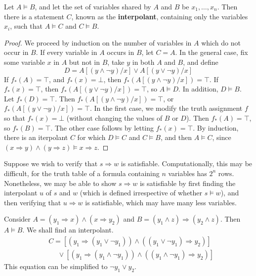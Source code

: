 \begin{theorem}
    Let $A \vDash B$, and let the set of variables shared by $A$ and $B$ be $x_1, \dots, x_n$. Then there is a statement $C$, known as the {\bf interpolant}, containing only the variables $x_i$, such that $A \vDash C$ and $C \vDash B$.
\end{theorem}
\begin{proof}
    We proceed by induction on the number of variables in $A$ which do not occur in $B$. If every variable in $A$ occurs in $B$, let $C = A$. In the general case, fix some variable $x$ in $A$ but not in $B$, take $y$ in both $A$ and $B$, and define
    \[ D = A[(y \wedge \neg y)/x] \vee A[(y \vee \neg y)/x] \]
    If $f_*(A) = \top$, and $f_*(x) = \bot$, then $f_*(A[(y \wedge \neg y)/x]) = \top$. If $f_*(x) = \top$, then $f_*(A[(y \vee \neg y)/x]) = \top$, so $A \vDash D$. In addition, $D \vDash B$. Let $f_*(D) = \top$. Then $f_*(A[(y \wedge \neg y)/x]) = \top$, or $f_*(A[(y \vee \neg y)/x]) = \top$. In the first case, we modify the truth assignment $f$ so that $f_*(x) = \bot$ (without changing the values of $B$ or $D$). Then $f_*(A) = \top$, so $f_*(B) = \top$. The other case follows by letting $f_*(x) = \top$. By induction, there is an iterpolant $C$ for which $D \vDash C$ and $C \vDash B$, and then $A \vDash C$, since $(x \Rightarrow y) \wedge (y \Rightarrow z) \vDash x \Rightarrow z$.
\end{proof}

Suppose we wish to verify that $s \Rightarrow w$ is satisfiable. Computationally, this may be difficult, for the truth table of a formula containing $n$ variables has $2^n$ rows. Nonetheless, we may be able to show $s \Rightarrow w$ is satisfiable by first finding the interpolant $u$ of $s$ and $w$ (which is defined irrespective of whether $s \vDash w$), and then verifying that $u \Rightarrow w$ is satisfiable, which may have many less variables.

\begin{example}
    Consider $A = (y_1 \Rightarrow x) \wedge (x \Rightarrow y_2)$ and $B = (y_1 \wedge z) \Rightarrow (y_2 \wedge z)$. Then $A \vDash B$. We shall find an interpolant.
    \begin{align*}
        &C = [(y_1 \Rightarrow (y_1 \vee \neg y_1)) \wedge ((y_1 \vee \neg y_1) \Rightarrow y_2)]\\
        &\ \ \ \ \ \ \vee [(y_1 \Rightarrow (y_1 \wedge \neg y_1)) \wedge ((y_1 \wedge \neg y_1) \Rightarrow y_2)]
    \end{align*}
    This equation can be simplified to $\neg y_1 \vee y_2$.
\end{example}

